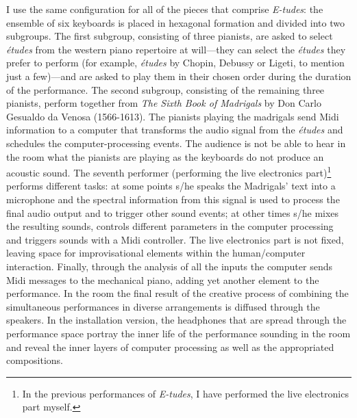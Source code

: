 I use the same configuration for all of the pieces that comprise \emph{E-tudes}: the ensemble of six keyboards is placed in hexagonal formation and divided into two subgroups. The first subgroup, consisting of three pianists, are asked to select \emph{\'{e}tudes} from the western piano repertoire at will---they can select the \emph{\'{e}tudes} they prefer to perform (for example, \emph{\'{e}tudes} by Chopin, Debussy or Ligeti, to mention just a few)---and are asked to play them in their chosen order during the duration of the performance. The second subgroup, consisting of the remaining three pianists, perform together from \emph{The Sixth Book of Madrigals} by Don Carlo Gesualdo da Venosa (1566-1613). The pianists playing the madrigals send Midi information to a computer that transforms the audio signal from the \emph{\'{e}tudes} and schedules the computer-processing events. The audience is not be able to hear in the room what the pianists are playing as the keyboards do not produce an acoustic sound. The seventh performer (performing the live electronics part)\footnote{In the previous performances of \emph{E-tudes}, I have performed the live electronics part myself.} performs different tasks: at some points s/he speaks the Madrigals' text into a microphone and the spectral information from this signal is used to process the final audio output and to trigger other sound events; at other times s/he mixes the resulting sounds, controls different parameters in the computer processing and triggers sounds with a Midi controller. The live electronics part is not fixed, leaving space for improvisational elements within the human/computer interaction. Finally, through the analysis of all the inputs the computer sends Midi messages to the mechanical piano, adding yet another element to the performance. In the room the final result of the creative process of combining the simultaneous performances in diverse arrangements is diffused through the speakers. In the installation version, the headphones that are spread through the performance space portray the inner life of the performance sounding in the room and reveal the inner layers of computer processing as well as the appropriated compositions.

